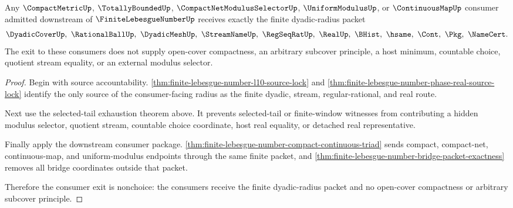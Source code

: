 \begin{theorem}
\label{thm:finite-lebesgue-number-compact-continuous-nonchoice-exit}
Any $\CompactMetricUp$, $\TotallyBoundedUp$, $\CompactNetModulusSelectorUp$, $\UniformModulusUp$, or $\ContinuousMapUp$ consumer admitted downstream of $\FiniteLebesgueNumberUp$ receives exactly the finite dyadic-radius packet
$$
\DyadicCoverUp,\ \RationalBallUp,\ \DyadicMeshUp,\ \StreamNameUp,\ \RegSeqRatUp,\ \RealUp,\ \BHist,\ \hsame,\ \Cont,\ \Pkg,\ \NameCert .
$$
The exit to these consumers does not supply open-cover compactness, an arbitrary subcover principle, a host minimum, countable choice, quotient stream equality, or an external modulus selector.
\end{theorem}
\begin{proof}
Begin with source accountability. \autoref{thm:finite-lebesgue-number-l10-source-lock} and \autoref{thm:finite-lebesgue-number-phase-real-source-lock} identify the only source of the consumer-facing radius as the finite dyadic, stream, regular-rational, and real route.

Next use the selected-tail exhaustion theorem above. It prevents selected-tail or finite-window witnesses from contributing a hidden modulus selector, quotient stream, countable choice coordinate, host real equality, or detached real representative.

Finally apply the downstream consumer package. \autoref{thm:finite-lebesgue-number-compact-continuous-triad} sends compact, compact-net, continuous-map, and uniform-modulus endpoints through the same finite packet, and \autoref{thm:finite-lebesgue-number-bridge-packet-exactness} removes all bridge coordinates outside that packet.

Therefore the consumer exit is nonchoice: the consumers receive the finite dyadic-radius packet and no open-cover compactness or arbitrary subcover principle.
\end{proof}

